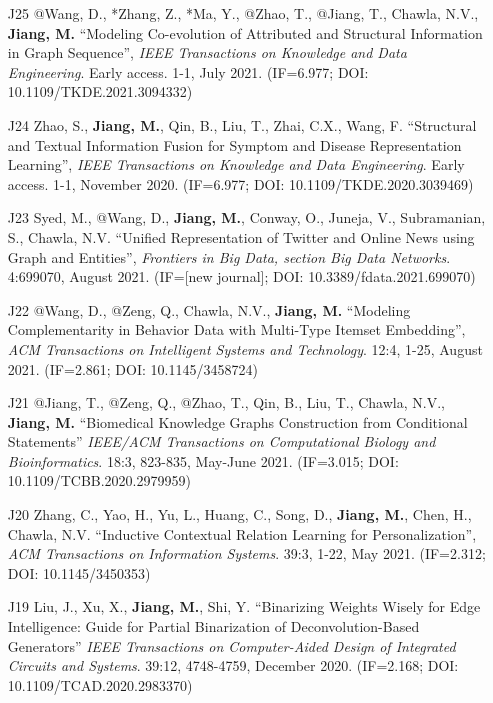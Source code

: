 \documentclass[10pt]{article}
\newenvironment{myindentpar}[1]%
{\begin{list}{}%
         {\setlength{\leftmargin}{#1}}%
         \item[]%
}
{\end{list}}
\newcounter{list}
\begin{document}
\begin{myindentpar}{0.00cm}
\begin{enumerate}[leftmargin=.5cm]
\item[J25] @Wang, D., *Zhang, Z., *Ma, Y., @Zhao, T., @Jiang, T., Chawla, N.V., \textbf{Jiang, M.} ``Modeling Co-evolution of Attributed and Structural Information in Graph Sequence'', \textit{IEEE Transactions on Knowledge and Data Engineering}. Early access. 1-1, July 2021. (IF=6.977; DOI: 10.1109/TKDE.2021.3094332)

\item[J24] Zhao, S., \textbf{Jiang, M.}, Qin, B., Liu, T., Zhai, C.X., Wang, F. ``Structural and Textual Information Fusion for Symptom and Disease Representation Learning'', \textit{IEEE Transactions on Knowledge and Data Engineering}. Early access. 1-1, November 2020. (IF=6.977; DOI: 10.1109/TKDE.2020.3039469)

\item[J23] Syed, M., @Wang, D., \textbf{Jiang, M.}, Conway, O., Juneja, V., Subramanian, S., Chawla, N.V. ``Unified Representation of Twitter and Online News using Graph and Entities'', \textit{Frontiers in Big Data, section Big Data Networks}. 4:699070, August 2021. (IF=[new journal]; DOI: 10.3389/fdata.2021.699070)

\item[J22] @Wang, D., @Zeng, Q., Chawla, N.V., \textbf{Jiang, M.} ``Modeling Complementarity in Behavior Data with Multi-Type Itemset Embedding'', \textit{ACM Transactions on Intelligent Systems and Technology}. 12:4, 1-25, August 2021. (IF=2.861; DOI: 10.1145/3458724)

\item[J21] @Jiang, T., @Zeng, Q., @Zhao, T., Qin, B., Liu, T., Chawla, N.V., \textbf{Jiang, M.} ``Biomedical Knowledge Graphs Construction from Conditional Statements'' \textit{IEEE/ACM Transactions on Computational Biology and Bioinformatics}. 18:3, 823-835, May-June 2021. (IF=3.015; DOI: 10.1109/TCBB.2020.2979959)

\item[J20] Zhang, C., Yao, H., Yu, L., Huang, C., Song, D., \textbf{Jiang, M.}, Chen, H., Chawla, N.V. ``Inductive Contextual Relation Learning for Personalization'', \textit{ACM Transactions on Information Systems}. 39:3, 1-22, May 2021. (IF=2.312; DOI: 10.1145/3450353)

\item[J19] Liu, J., Xu, X., \textbf{Jiang, M.}, Shi, Y. ``Binarizing Weights Wisely for Edge Intelligence: Guide for Partial Binarization of Deconvolution-Based Generators'' \textit{IEEE Transactions on Computer-Aided Design of Integrated Circuits and Systems}. 39:12, 4748-4759, December 2020. (IF=2.168; DOI: 10.1109/TCAD.2020.2983370)


\end{enumerate}
\end{myindentpar}
\end{document}
